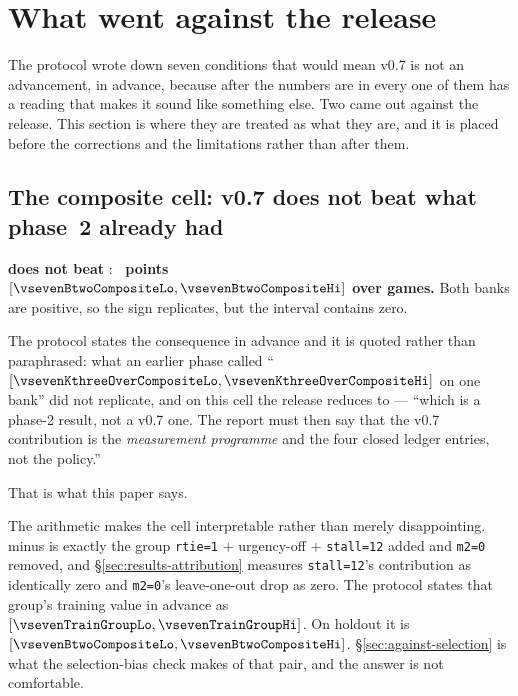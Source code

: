\section{What went against the release}
\label{sec:against}

The protocol wrote down seven conditions that would mean v0.7 is not an advancement, in advance,
because after the numbers are in every one of them has a reading that makes it sound like something
else. Two came out against the release. This section is where they are treated as what they are, and
it is placed before the corrections and the limitations rather than after them.

\subsection{The composite cell: v0.7 does not beat what phase~2 already had}
\label{sec:against-composite}

\frozen{} \textbf{does not beat} \composite{}: \textbf{\vsevenBtwoComposite{}~points
$[\vsevenBtwoCompositeLo, \vsevenBtwoCompositeHi]$ over \vsevenBtwoCompositeN{} games.} Both banks are
positive, so the sign replicates, but the interval contains zero.

The protocol states the consequence in advance and it is quoted rather than paraphrased: what an
earlier phase called ``\vsevenKthreeOverComposite{}
$[\vsevenKthreeOverCompositeLo, \vsevenKthreeOverCompositeHi]$ on one bank'' did not replicate, and on
this cell the release reduces to \composite{} --- ``which is a phase-2 result, not a v0.7 one. The
report must then say that the v0.7 contribution is the \emph{measurement programme} and the four
closed ledger entries, not the policy.''

That is what this paper says.

The arithmetic makes the cell interpretable rather than merely disappointing. \frozen{} minus
\composite{} is exactly the group \texttt{rtie=1} $+$ urgency-off $+$ \texttt{stall=12} added and
\texttt{m2=0} removed, and \S\ref{sec:results-attribution} measures \texttt{stall=12}'s contribution
as identically zero and \texttt{m2=0}'s leave-one-out drop as zero. The protocol states that group's
training value in advance as \vsevenTrainGroup{}
$[\vsevenTrainGroupLo, \vsevenTrainGroupHi]$. On holdout it is \vsevenBtwoComposite{}
$[\vsevenBtwoCompositeLo, \vsevenBtwoCompositeHi]$. \S\ref{sec:against-selection} is what the
selection-bias check makes of that pair, and the answer is not comfortable.

